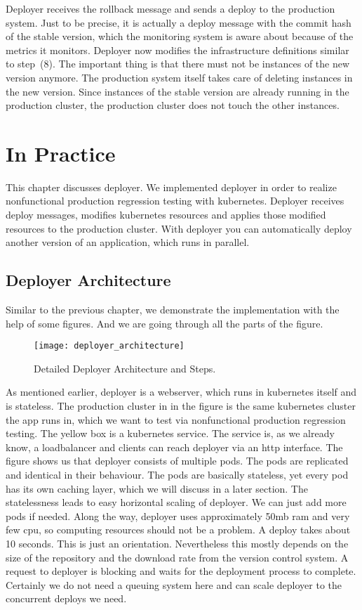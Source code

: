 Deployer receives the rollback message and sends a deploy to the production system. Just
to be precise, it is actually a deploy message with the commit hash of the stable version,
which the monitoring system is aware about because of the metrics it monitors. Deployer
now modifies the infrastructure definitions similar to step~(8). The important thing is
that there must not be instances of the new version anymore. The production system itself
takes care of deleting instances in the new version. Since instances of the stable version
are already running in the production cluster, the production cluster does not touch the
other instances.

\chapter{In Practice}

This chapter discusses deployer. We implemented deployer in order to realize nonfunctional
production regression testing with kubernetes. Deployer receives deploy messages, modifies
kubernetes resources and applies those modified resources to the production cluster. With
deployer you can automatically deploy another version of an application, which runs in
parallel.


\section{Deployer Architecture}

Similar to the previous chapter, we demonstrate the implementation with the help of some
figures. And we are going through all the parts of the figure.

\begin{figure}[htbp]
  \centering
  \texttt{[image: deployer\_architecture]}
  \caption[nprtflow]{Detailed Deployer Architecture and Steps.}
  \label{fig:deployer_architecture}
\end{figure}

As mentioned earlier, deployer is a webserver, which runs in kubernetes itself and is
stateless. The production cluster in in the figure is the same kubernetes cluster the app
runs in, which we want to test via nonfunctional production regression testing. The yellow
box is a kubernetes service. The service is, as we already know, a loadbalancer and
clients can reach deployer via an http interface. The figure shows us that deployer
consists of multiple pods. The pods are replicated and identical in their behaviour. The
pods are basically stateless, yet every pod has its own caching layer, which we will
discuss in a later section. The statelessness leads to easy horizontal scaling of
deployer. We can just add more pods if needed. Along the way, deployer uses approximately
50mb ram and very few cpu, so computing resources should not be a problem. A deploy takes
about 10 seconds. This is just an orientation. Nevertheless this mostly depends on the
size of the repository and the download rate from the version control system. A request to
deployer is blocking and waits for the deployment process to complete. Certainly we do not
need a queuing system here and can scale deployer to the concurrent deploys we need.


